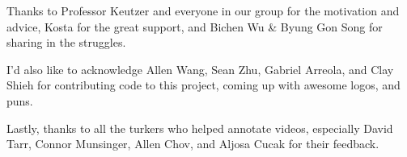 Thanks to Professor Keutzer and everyone in our group for the motivation and advice, Kosta for the great support, and Bichen Wu \& Byung Gon Song for sharing in the struggles.

I'd also like to acknowledge Allen Wang, Sean Zhu, Gabriel Arreola, and Clay Shieh for contributing code to this project, coming up with awesome logos, and puns.

Lastly, thanks to all the turkers who helped annotate videos, especially David Tarr, Connor Munsinger, Allen Chov, and Aljosa Cucak for their feedback.
